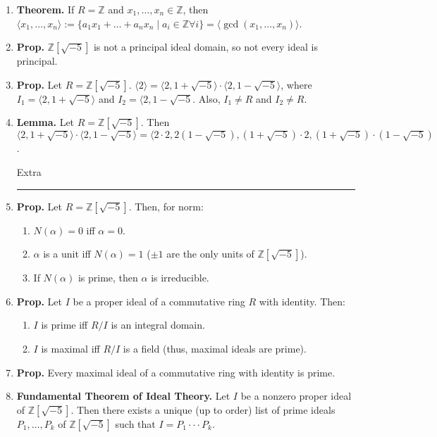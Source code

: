 \begin{enumerate}
	\item \textbf{Theorem. } If $R = \mathbb{Z}$ and $x_1,\dots,x_n \in \mathbb{Z}$, then $\langle x_1,\dots,x_n \rangle := \{a_1x_1 + \dots + a_nx_n \mid a_i \in \mathbb{Z} \forall i\} = \langle \gcd(x_1,\dots,x_n) \rangle$. 
	\item \textbf{Prop. } $\mathbb{Z}[\sqrt{-5}]$ is not a principal ideal domain, so not every ideal is principal. 
	\item \textbf{Prop. } Let $R = \mathbb{Z}[\sqrt{-5}]$. $\langle 2 \rangle = \langle 2,1+\sqrt{-5} \rangle \cdot \langle 2, 1-\sqrt{-5} \rangle$, where $I_1 = \langle 2,1+\sqrt{-5} \rangle$ and $I_2 = \langle 2,1-\sqrt{-5}$. Also, $I_1 \neq R$ and $I_2 \neq R$. 
	\item \textbf{Lemma. } Let $R = \mathbb{Z}[\sqrt{-5}]$. Then $\langle 2,1+\sqrt{-5} \rangle \cdot \langle 2,1-\sqrt{-5} \rangle = \langle 2 \cdot 2, 2(1-\sqrt{-5}), (1+\sqrt{-5}) \cdot 2, (1+\sqrt{-5}) \cdot (1 - \sqrt{-5})$. 
	\begin{center}
		Extra \\
		\hrule 
	\end{center}
	\item \textbf{Prop. } Let $R = \mathbb{Z}[\sqrt{-5}]$. Then, for norm: 
	\begin{enumerate}
		\item $N(\alpha) = 0$ iff $\alpha = 0$. 
		\item $\alpha$ is a unit iff $N(\alpha)=1$ ($\pm 1$ are the only units of $\mathbb{Z}[\sqrt{-5}]$). 
		\item If $N(\alpha)$ is prime, then $\alpha$ is irreducible. 
	\end{enumerate}
	\item \textbf{Prop. } Let $I$ be a proper ideal of a commutative ring $R$ with identity. Then:
	\begin{enumerate}
		\item $I$ is prime iff $R/I$ is an integral domain. 
		\item $I$ is maximal iff $R/I$ is a field (thus, maximal ideals are prime). 
	\end{enumerate}
	\item \textbf{Prop. } Every maximal ideal of a commutative ring with identity is prime. 
	\item \textbf{Fundamental Theorem of Ideal Theory. } Let $I$ be a nonzero proper ideal of $\mathbb{Z}[\sqrt{-5}]$. Then there exists a unique (up to order) list of prime ideals $P_1,\dots,P_k$ of $\mathbb{Z}[\sqrt{-5}]$ such that $I = P_1 \cdot \cdot \cdot P_k$. 

\end{enumerate}
